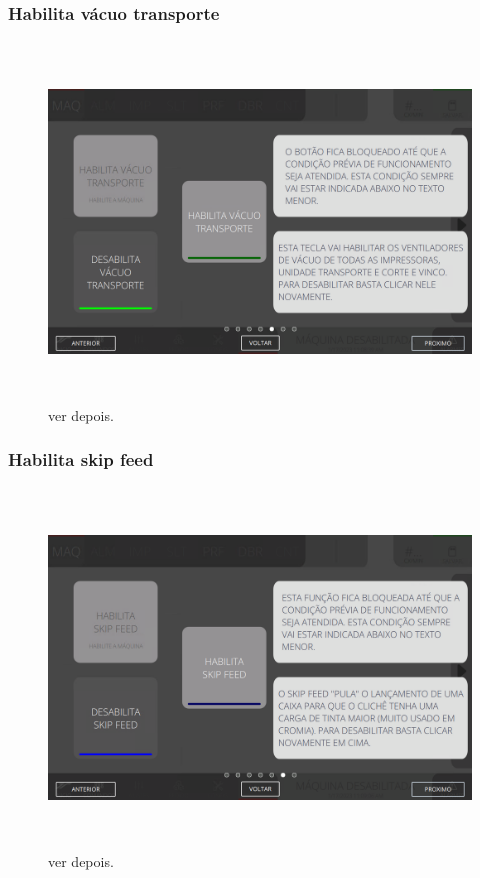 \vspace*{\fill}

\newpage
\thispagestyle{fancy}

\vspace*{\fill}

\subsubsection{\small{Habilita vácuo transporte}}

\begin{figure}[h]
  \centering
  \includegraphics[width=576px,height=360px]{src/images/02-machine/e-5.png}
  \caption{ver depois.}
   \label{}
\end{figure}

\vspace*{\fill}

\newpage
\thispagestyle{fancy}

\vspace*{\fill}

\subsubsection{\small{Habilita skip feed}}

\begin{figure}[h]
  \centering
  \includegraphics[width=576px,height=360px]{src/images/02-machine/e-6.png}
  \caption{ver depois.}
   \label{}
\end{figure}

